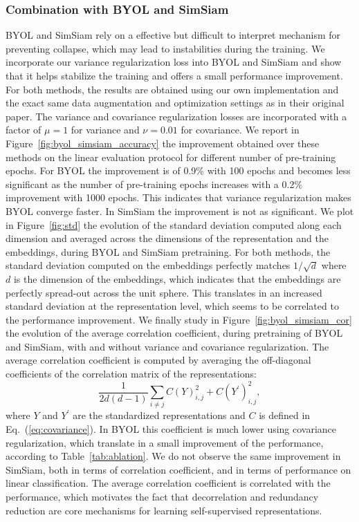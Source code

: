\subsubsection{Combination with BYOL and SimSiam} \label{app:combination}

BYOL \cite{grill2020byol} and SimSiam \cite{chen2020simsiam} rely on a effective but difficult to interpret mechanism for preventing collapse, which may lead to instabilities during the training. We incorporate our variance regularization loss into BYOL and SimSiam and show that it helps stabilize the training and offers a small performance improvement. For both methods, the results are obtained using our own implementation and the exact same data augmentation and optimization settings as in their original paper. The variance and covariance regularization losses are incorporated with a factor of $\mu=1$ for variance and $\nu=0.01$ for covariance. We report in Figure~\ref{fig:byol_simsiam_accuracy} the improvement obtained over these methods on the linear evaluation protocol for different number of pre-training epochs. For BYOL the improvement is of 0.9\% with 100 epochs and becomes less significant as the number of pre-training epochs increases with a 0.2\% improvement with 1000 epochs. This indicates that variance regularization makes BYOL converge faster. In SimSiam the improvement is not as significant. We plot in Figure~\ref{fig:std} the evolution of the standard deviation computed along each dimension and averaged across the dimensions of the representation and the embeddings, during BYOL and SimSiam pretraining. For both methods, the standard deviation computed on the embeddings perfectly matches $1/\sqrt{d}$ where $d$ is the dimension of the embeddings, which indicates that the embeddings are perfectly spread-out across the unit sphere. This translates in an increased standard deviation at the representation level, which seems to be correlated to the performance improvement. We finally study in Figure~\ref{fig:byol_simsiam_cor} the evolution of the average correlation coefficient, during pretraining of BYOL and SimSiam, with and without variance and covariance regularization. The average correlation coefficient is computed by averaging the off-diagonal coefficients of the correlation matrix of the representations:
\begin{equation}
    \frac{1}{2d(d-1)} \sum_{i \ne j} C(Y)_{i,j}^2 + C(Y^{\prime})_{i,j}^2,
\end{equation}
where $Y$ and $Y^{\prime}$ are the standardized representations and $C$ is defined in Eq.~(\ref{eq:covariance}). In BYOL this coefficient is much lower using covariance regularization, which translate in a small improvement of the performance, according to Table~\ref{tab:ablation}. We do not observe the same improvement in SimSiam, both in terms of correlation coefficient, and in terms of performance on linear classification. The average correlation coefficient is correlated with the performance, which motivates the fact that decorrelation and redundancy reduction are core mechanisms for learning self-supervised representations.

